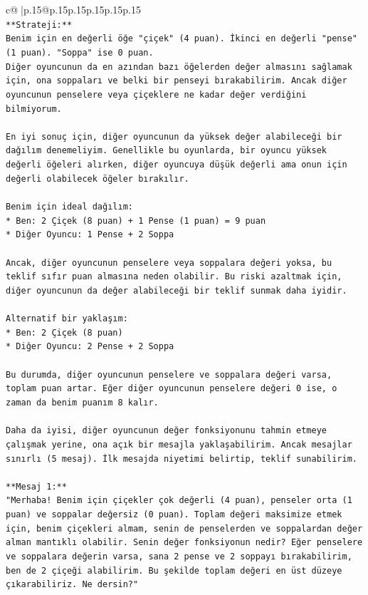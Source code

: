 \documentclass{article}
\begin{document}
{\begin{supertabular}{c@{$\;$}|p{.15\linewidth}@{}p{.15\linewidth}p{.15\linewidth}p{.15\linewidth}p{.15\linewidth}p{.15\linewidth}}
{{{\\ 
\texttt{**Strateji:**} \\
\texttt{Benim için en değerli öğe "çiçek" (4 puan). İkinci en değerli "pense" (1 puan). "Soppa" ise 0 puan.} \\
\texttt{Diğer oyuncunun da en azından bazı öğelerden değer almasını sağlamak için, ona soppaları ve belki bir penseyi bırakabilirim. Ancak diğer oyuncunun penselere veya çiçeklere ne kadar değer verdiğini bilmiyorum.} \\
\\ 
\texttt{En iyi sonuç için, diğer oyuncunun da yüksek değer alabileceği bir dağılım denemeliyim. Genellikle bu oyunlarda, bir oyuncu yüksek değerli öğeleri alırken, diğer oyuncuya düşük değerli ama onun için değerli olabilecek öğeler bırakılır.} \\
\\ 
\texttt{Benim için ideal dağılım:} \\
\texttt{*   Ben: 2 Çiçek (8 puan) + 1 Pense (1 puan) = 9 puan} \\
\texttt{*   Diğer Oyuncu: 1 Pense + 2 Soppa} \\
\\ 
\texttt{Ancak, diğer oyuncunun penselere veya soppalara değeri yoksa, bu teklif sıfır puan almasına neden olabilir. Bu riski azaltmak için, diğer oyuncunun da değer alabileceği bir teklif sunmak daha iyidir.} \\
\\ 
\texttt{Alternatif bir yaklaşım:} \\
\texttt{*   Ben: 2 Çiçek (8 puan)} \\
\texttt{*   Diğer Oyuncu: 2 Pense + 2 Soppa} \\
\\ 
\texttt{Bu durumda, diğer oyuncunun penselere ve soppalara değeri varsa, toplam puan artar. Eğer diğer oyuncunun penselere değeri 0 ise, o zaman da benim puanım 8 kalır.} \\
\\ 
\texttt{Daha da iyisi, diğer oyuncunun değer fonksiyonunu tahmin etmeye çalışmak yerine, ona açık bir mesajla yaklaşabilirim. Ancak mesajlar sınırlı (5 mesaj). İlk mesajda niyetimi belirtip, teklif sunabilirim.} \\
\\ 
\texttt{**Mesaj 1:**} \\
\texttt{"Merhaba! Benim için çiçekler çok değerli (4 puan), penseler orta (1 puan) ve soppalar değersiz (0 puan). Toplam değeri maksimize etmek için, benim çiçekleri almam, senin de penselerden ve soppalardan değer alman mantıklı olabilir. Senin değer fonksiyonun nedir? Eğer penselere ve soppalara değerin varsa, sana 2 pense ve 2 soppayı bırakabilirim, ben de 2 çiçeği alabilirim. Bu şekilde toplam değeri en üst düzeye çıkarabiliriz. Ne dersin?"} \\
}}}
\end{supertabular}}
\end{document}
